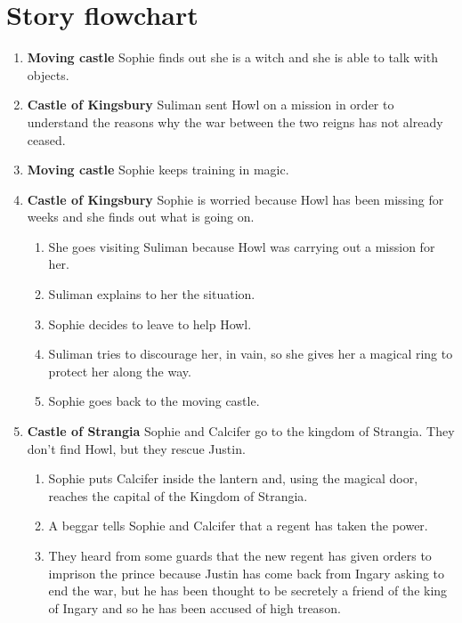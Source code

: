 \section{Story flowchart}

\begin{enumerate}
\item \textbf{Moving castle} Sophie finds out she is a witch and she is able to talk with objects.
  
\item \textbf{Castle of Kingsbury} Suliman sent Howl on a mission in order to understand the reasons why the war between the two reigns has not already ceased.
  
\item \textbf{Moving castle} Sophie keeps training in magic.
  
\item \textbf{Castle of Kingsbury} Sophie is worried because Howl has been missing for weeks and she finds out what is going on.
  \begin{enumerate}
  \item She goes visiting Suliman because Howl was carrying out a mission for her.
    
  \item Suliman explains to her the situation.

  \item Sophie decides to leave to help Howl.

  \item Suliman tries to discourage her, in vain, so she gives her a magical ring to protect her along the way.

  \item Sophie goes back to the moving castle.
  \end{enumerate}

\item \textbf{Castle of Strangia} Sophie and Calcifer go to the kingdom of Strangia. They don’t find Howl, but they rescue Justin.

  \begin{enumerate}
  \item Sophie puts Calcifer inside the lantern and, using the magical door, reaches  the capital of the Kingdom of Strangia.
    
  \item A beggar tells Sophie and Calcifer that a regent has taken the power.
    
  \item They heard from some guards that the new regent has given orders to imprison the prince because Justin has come back from Ingary asking to end the war, but he has been thought to be secretely a friend of the king of Ingary and so he has been accused of high treason.
    

\end{enumerate}
\end{enumerate}
